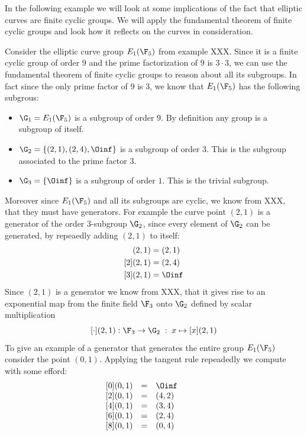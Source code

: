 In the following example we will look at some implications of the fact that elliptic curves are finite cyclic groups. We will apply the fundamental theorem of finite cyclic groups and look how it reflects on the curves in consideration.
\begin{example}Consider the elliptic curve group $E_1(\F_5)$ from example XXX. Since it is a finite cyclic group of order $9$ and the prime factorization of $9$ is $3\cdot 3$, we can use the fundamental theorem of finite cyclic groups to reason about all its subgroups. In fact since the only prime factor of $9$ is $3$, we know that $E_1(\F_5)$ has the following subgrous:
\begin{itemize}
\item $\G_1 = E_1(\F_5)$ is a subgroup of order $9$. By definition any group is a subgroup of itself.
\item $\G_2 = \{(2,1),(2,4),\Oinf\}$ is a subgroup of order $3$. This is the subgroup associated to the prime factor $3$.
\item $\G_3 = \{\Oinf\}$ is a subgroup of order $1$. This is the trivial subgroup.
\end{itemize}
Moreover since $E_1(\F_5)$ and all its subgroups are cyclic, we know from XXX, that they must have generators. For example the curve point $(2,1)$ is a generator of the order $3$-subgroup $\G_2$, since every element of $\G_2$ can be generated, by repeaedly adding $(2,1)$ to itself: 
\begin{align*}
[1](2,1) & = (2,1) \\
[2](2,1) & = (2,4) \\
[3](2,1) & = \Oinf
\end{align*}
Since $(2,1)$ is a generator we know from XXX, that it gives rise to an exponential map from the finite field $\F_3$ onto $\G_2$ defined by scalar multiplication
$$
[\cdot](2,1): \F_3 \to \G_2\; : \; x\mapsto [x](2,1) 
$$
To give an example of a generator that generates the entire group $E_1(\F_5)$ consider the point $(0,1)$. Applying the tangent rule repeadedly we compute with some efford:
$$
\begin{array}{lccr}
{}\begin{array}{lcl}
{}[0](0,1) &=& \Oinf \\
{}[2](0,1) &=& (4, 2) \\ 
{}[4](0,1) &=& (3, 4) \\ 
{}[6](0,1) &=& (2, 4) \\ 
{}[8](0,1) &=& (0, 4) \\ 
\end{array} & & &

\end{array}$$
\end{example}
